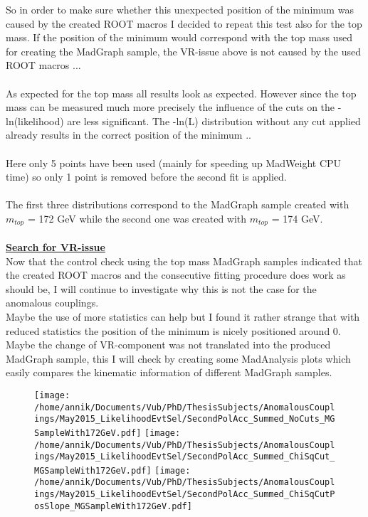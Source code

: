 So in order to make sure whether this unexpected position of the minimum was caused by the created ROOT macros I decided to repeat this test also for the top mass. If the position of the minimum would correspond with the top mass used for creating the MadGraph sample, the VR-issue above is not caused by the used ROOT macros ...\\
\\
As expected for the top mass all results look as expected. However since the top mass can be measured much more precisely the influence of the cuts on the -ln(likelihood) are less significant. The -ln(L) distribution without any cut applied already results in the correct position of the minimum ..\\
\\
Here only 5 points have been used (mainly for speeding up MadWeight CPU time) so only 1 point is removed before the second fit is applied.\\
\\
The first three distributions correspond to the MadGraph sample created with $m_{top}$ = 172 GeV while the second one was created with $m_{top}$ = 174 GeV.\\
\\
\textbf{\underline{Search for VR-issue}}\\
Now that the control check using the top mass MadGraph samples indicated that the created ROOT macros and the consecutive fitting procedure does work as should be, I will continue to investigate why this is not the case for the anomalous couplings.\\
Maybe the use of more statistics can help but I found it rather strange that with reduced statistics the position of the minimum is nicely positioned around $0$. Maybe the change of VR-component was not translated into the produced MadGraph sample, this I will check by creating some MadAnalysis plots which easily compares the kinematic information of different MadGraph samples.

\begin{figure}[h!t]
 \centering
 \texttt{[image: /home/annik/Documents/Vub/PhD/ThesisSubjects/AnomalousCouplings/May2015\_LikelihoodEvtSel/SecondPolAcc\_Summed\_NoCuts\_MGSampleWith172GeV.pdf]}
 \texttt{[image: /home/annik/Documents/Vub/PhD/ThesisSubjects/AnomalousCouplings/May2015\_LikelihoodEvtSel/SecondPolAcc\_Summed\_ChiSqCut\_MGSampleWith172GeV.pdf]}
 \texttt{[image: /home/annik/Documents/Vub/PhD/ThesisSubjects/AnomalousCouplings/May2015\_LikelihoodEvtSel/SecondPolAcc\_Summed\_ChiSqCutPosSlope\_MGSampleWith172GeV.pdf]}
\end{figure}

